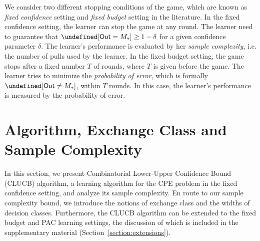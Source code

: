 \documentclass{article}
\newcommand{\Algorithm}{{\small \textsf{CLUCB}}\xspace}
\newcommand{\Problem}{{CPE}\xspace}
\newcommand{\M}{\mathcal M}
\newcommand{\RR}{\mathbb R}
\newcommand{\out}{\mathsf{Out}}
\let\Pr\undefined
\DeclareMathOperator{\Pr}{Pr}
\newcommand{\MultiIdent}{\textsc{TopK}\xspace}
\newcommand{\MultiBandit}{\textsc{MB}\xspace}
\renewcommand{\vec}[1]{\boldsymbol{#1}}
\begin{document}
We consider two different stopping conditions of the game, which are known as \emph{fixed confidence} setting and \emph{fixed budget} setting in the literature.
In the fixed confidence setting, the learner can stop the game at any round. 
The learner need to guarantee that $\Pr[\out = M_*] \ge 1-\delta$ for a given confidence parameter $\delta$.
The learner's performance is evaluated by her \emph{sample complexity}, i.e. the number of pulls used by the learner.
In the fixed budget setting, the game stops after a fixed number $T$ of rounds, where $T$ is given before the game.
The learner tries to minimize the \emph{probability of error}, which is formally $\Pr[\out \not= M_*]$, within $T$ rounds.
In this case, the learner's performance is measured by the probability of error.





\vspace{-0.7em}
\section{Algorithm, Exchange Class and Sample Complexity}
\vspace{-0.7em}


In this section, we present Combinatorial Lower-Upper Confidence Bound (\Algorithm) algorithm, a learning algorithm for the \Problem problem in the fixed confidence setting, and analyze its sample complexity. 
En route to our sample complexity bound, we introduce the notions of exchange class and the widths of decision classes.
Furthermore, the \Algorithm algorithm can be extended to the fixed budget and PAC learning settings,
	the discussion of which is included in the supplementary material (Section~\ref{section:extensions}).
\end{document}
